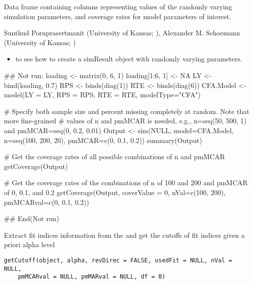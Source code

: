 \documentclass[a4paper]{book}
\begin{document}
%
\begin{Value}
Data frame containing columns representing values of the randomly varying simulation parameters, and coverage rates for model parameters of interest.
\end{Value}
%
\begin{Author}\relax
Sunthud Pornprasertmanit (University of Kansas; ), Alexander M. Schoemann (University of Kansas; )
\end{Author}
%
\begin{SeeAlso}\relax
\begin{itemize}

\item {} to see how to create a simResult object with randomly varying parameters.

\end{itemize}

\end{SeeAlso}
%
\begin{Examples}
\begin{ExampleCode}
## Not run: 
loading <- matrix(0, 6, 1)
loading[1:6, 1] <- NA
LY <- bind(loading, 0.7)
RPS <- binds(diag(1))
RTE <- binds(diag(6))
CFA.Model <- model(LY = LY, RPS = RPS, RTE = RTE, modelType="CFA")

# Specify both sample size and percent missing completely at random. Note that more fine-grained 
# values of n and pmMCAR is needed, e.g., n=seq(50, 500, 1) and pmMCAR=seq(0, 0.2, 0.01)
Output <- sim(NULL, model=CFA.Model, n=seq(100, 200, 20), pmMCAR=c(0, 0.1, 0.2))
summary(Output)

# Get the coverage rates of all possible combinations of n and pmMCAR
getCoverage(Output)

# Get the coverage rates of the combinations of n of 100 and 200 and pmMCAR of 0, 0.1, and 0.2
getCoverage(Output, coverValue = 0, nVal=c(100, 200), pmMCARval=c(0, 0.1, 0.2))

## End(Not run)
\end{ExampleCode}
\end{Examples}
%
\begin{Description}\relax
Extract fit indices information from the  and get the cutoffs of fit indices given a priori alpha level
\end{Description}
%
\begin{Usage}
\begin{verbatim}
getCutoff(object, alpha, revDirec = FALSE, usedFit = NULL, nVal = NULL, 
	pmMCARval = NULL, pmMARval = NULL, df = 0)
\end{verbatim}
\end{Usage}
\end{document}
